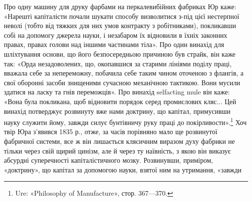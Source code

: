 Про одну машину для друку фарбами на перкалевибійних
фабриках Юр каже: «Нарешті капіталісти почали шукати способу
визволитися з-під цієї нестерпної неволі (тобто від тяжких
для них умов контракту з робітниками), покликавши собі на допомогу
джерела науки, і незабаром їх відновили в їхніх законних
правах, правах голови над іншими частинами тіла». Про один
винахід для шліхтування основи, що його безпосередньою причиною
був страйк, він каже так: «Орда незадоволених, що, окопавшися
за старими лініями поділу праці, вважала себе за непереможну,
побачила себе таким чином оточеною з флангів, а свої
оборонні засоби знищеними сучасною механічною тактикою. Вони
мусили здатися на ласку та гнів переможців». Про винахід
selfacting mule він каже: «Вона була покликана, щоб відновити
порядок серед промислових кляс... Цей винахід потверджує
розвинуту вже нами доктрину, що капітал, примусивши науку
служити йому, завжди силує бунтівничу руку праці до покірливости».\footnote{
Ure: «Philosophy of Manufacture», стор. 367—370.
}
Хоч твір Юра з’явився 1835 р., отже, за часів порівняно
мало ще розвинутої фабричної системи, все ж він лишається клясичним
виразом духу фабрики не тільки через свій щирий цинізм,
але й через ту наївність, з якою він виказує абсурдні суперечності
капіталістичного мозку. Розвинувши, приміром, «доктрину»,
що капітал за допомогою науки, взятої ним на утримання, «завжди
\parbreak{}  %
